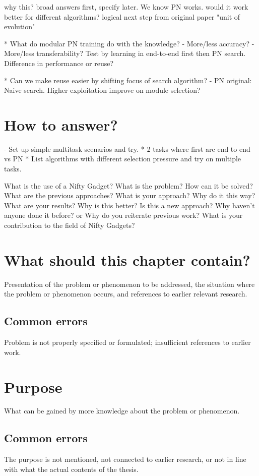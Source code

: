 why this? broad answers first, specify later. 
We know PN works. would it work better for different algorithms?
logical next step from original paper "unit of evolution"




* What do modular PN training do with the knowledge? 
- More/less accuracy?
- More/less transferability? 
Test by learning in end-to-end first then PN search. 
Difference in performance or reuse?

* Can we make reuse easier by shifting focus of search algorithm?
- PN original: Naive search. Higher exploitation improve on module selection?

\section{How to answer?}
- Set up simple multitask scenarios and try. 
* 2 tasks where first are end to end vs PN
* List algorithms with different selection pressure and try on multiple tasks. 


    What is the use of a Nifty Gadget? 
    What is the problem? 
    How can it be solved? 
    What are the previous approaches? 
    What is your approach? 
    Why do it this way? 
    What are your results? 
    Why is this better? 
    Is this a new approach? 
    Why haven't anyone done it before? 
    or
    Why do you reiterate previous work? 
    What is your contribution to the field of Nifty Gadgets? 
    
    \section{What should this chapter contain?}
    Presentation of the problem or phenomenon to be addressed, the situation where the problem or phenomenon occurs, and references to earlier relevant research. 
    \subsection{Common errors}
    Problem is not properly specified or formulated; insufficient references to earlier work.  
    
    \section{Purpose}
    What can be gained by more knowledge about the problem or phenomenon. 
    \subsection{Common errors}
    The purpose is not mentioned, not connected to earlier research, or not in line with what the actual contents of the thesis.  
    
